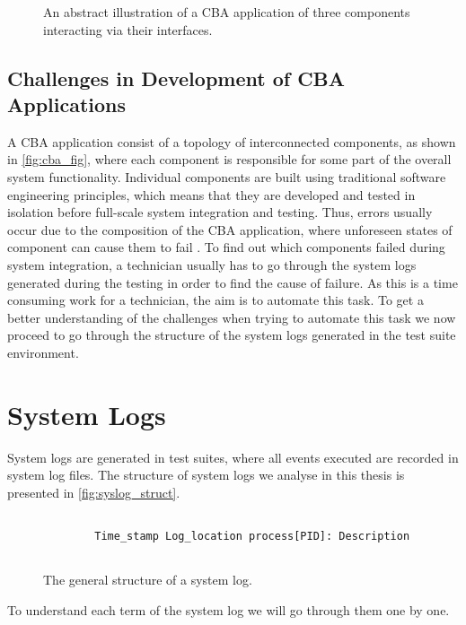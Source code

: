 \begin{figure}[H]
    \centering
    \scalebox{.5}{}
    \caption{An abstract illustration of a CBA application of three components interacting via their interfaces.}
    \label{fig:cba_fig}
\end{figure}


\subsection{Challenges in Development of CBA Applications}
A CBA application consist of a topology of interconnected components, as shown in \autoref{fig:cba_fig}, where each component is responsible for some part of the overall system functionality. Individual components are built using traditional software engineering principles, which means that they are developed and tested in isolation before full-scale system integration and testing. Thus, errors usually occur due to the composition of the CBA application, where unforeseen states of component can cause them to fail \cite{Szyperski:2002:CSB:515228}. To find out which components failed during system integration, a technician usually has to go through the system logs generated during the testing in order to find the cause of failure. As this is a time consuming work for a technician, the aim is to automate this task. To get a better understanding of the challenges when trying to automate this task we now proceed to go through the structure of the system logs generated in the test suite environment. 

\section{System Logs}
System logs are generated in test suites, where all events executed are recorded in system log files. The structure of system logs we analyse in this thesis is presented in \autoref{fig:syslog_struct}.


\begin{figure}[H]
    \centering
        \begin{verbatim}
         
        Time_stamp Log_location process[PID]: Description
    
        \end{verbatim}
    \caption{The general structure of a system log.}
    \label{fig:syslog_struct}
\end{figure}

\noindent To understand each term of the system log we will go through them one by one.

